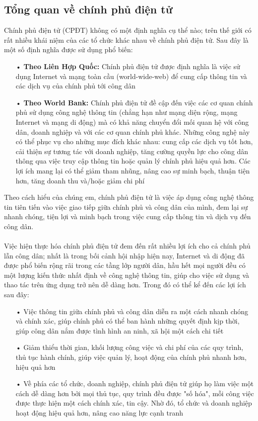 \documentclass[a4paper]{article}
\begin{document}
\subsection{Tổng quan về chính phủ điện tử}
Chính phủ điện tử (CPĐT) không có một định nghĩa cụ thể nào; trên thế giới có rất nhiều khái niệm của các tổ chức khác nhau về chính phủ điện tử. Sau đây là một số định nghĩa được sử dụng phổ biến:
\begin{itemize}
	\item[•]\textbf{Theo Liên Hợp Quốc: }Chính phủ điện tử được định nghĩa là việc sử dụng Internet và mạng toàn cầu (world-wide-web) để cung cấp thông tin và các dịch vụ của chính phủ tới công dân \cite{bib1}
	\item[•]\textbf{Theo World Bank: }Chính phủ điện tử đề cập đến việc các cơ quan chính phủ sử dụng công nghệ thông tin (chẳng hạn như mạng diện rộng, mạng Internet và mạng di động) mà có khả năng chuyển đổi mối quan hệ với công dân, doanh nghiệp và với các cơ quan chính phủ khác. Những công nghệ này có thể phục vụ cho những mục đích khác nhau: cung cấp các dịch vụ tốt hơn, cải thiện sự tương tác với doanh nghiệp, tăng cường quyền lực cho công dân thông qua việc truy cập thông tin hoặc quản lý chính phủ hiệu quả hơn. Các lợi ích mang lại có thể giảm tham nhũng, nâng cao sự minh bạch, thuận tiện hơn, tăng doanh thu và/hoặc giảm chi phí \cite{bib2}
\end{itemize}
Theo cách hiểu của chúng em, chính phủ điện tử là việc áp dụng công nghệ thông tin tiên tiến vào việc giao tiếp giữa chính phủ và công dân của mình, đem lại sự nhanh chóng, tiện lợi và minh bạch trong việc cung cấp thông tin và dịch vụ đến công dân.\\
\\
Việc hiện thực hóa chính phủ điện tử đem đến rất nhiều lợi ích cho cả chính phủ lẫn công dân; nhất là trong bối cảnh hội nhập hiện nay, Internet và di động đã được phổ biến rộng rãi trong các tầng lớp người dân, hầu hết mọi người đều có một lượng kiến thức nhất định về công nghệ thông tin, giúp cho việc sử dụng và thao tác trên ứng dụng trở nên dễ dàng hơn. Trong đó có thể kể đến các lợi ích sau đây:
\begin{itemize}
	\item[•]Việc thông tin giữa chính phủ và công dân diễn ra một cách nhanh chóng và chính xác, giúp chính phủ có thể ban hành những quyết định kịp thời, giúp công dân nắm được tình hình an ninh, xã hội một cách chi tiết
	\item[•]Giảm thiểu thời gian, khối lượng công việc và chi phí của các quy trình, thủ tục hành chính, giúp việc quản lý, hoạt động của chính phủ nhanh hơn, hiệu quả hơn
	\item[•]Về phía các tổ chức, doanh nghiệp, chính phủ điện tử giúp họ làm việc một cách dễ dàng hơn bởi mọi thủ tục, quy trình đều được "số hóa", mỗi công việc được thực hiện một cách chính xác, tin cậy. Nhờ đó, tổ chức và doanh nghiệp hoạt động hiệu quả hơn, nâng cao năng lực cạnh tranh
\end{itemize}
\end{document}
